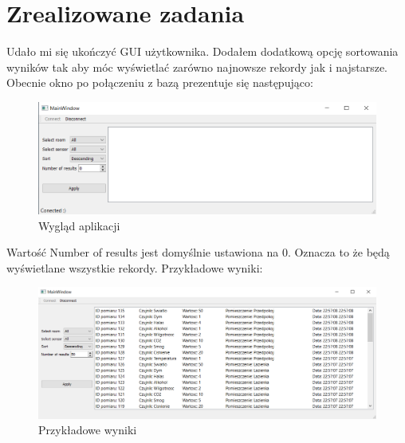 \documentclass[10pt, a4paper]{article}
\begin{document}
\section{Zrealizowane zadania}
	Udało mi się ukończyć GUI użytkownika. Dodałem dodatkową opcję sortowania wyników tak aby móc wyświetlać zarówno najnowsze rekordy jak i najstarsze. Obecnie okno po połączeniu z bazą prezentuje się następująco:
	\begin{figure}[H]
		\centering
		\includegraphics[width=1\textwidth]{figures/okno.png}
		\caption{Wygląd aplikacji}
	\end{figure}
	Wartość Number of results jest domyślnie ustawiona na 0. Oznacza to że będą wyświetlane wszystkie rekordy.
	Przykładowe wyniki:
	\begin{figure}[H]
		\centering
		\includegraphics[width=1\textwidth]{figures/okno1.png}
		\caption{Przykładowe wyniki}
	\end{figure}
\end{document}

